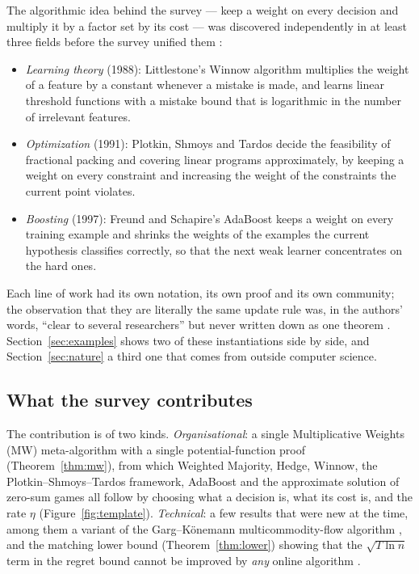 \documentclass[11pt,a4paper]{article}
\theoremstyle{plain}
\theoremstyle{definition}
\newcommand{\sq}[1]{\sqrt{#1}}
\begin{document}
The algorithmic idea behind the survey --- keep a weight on every decision and multiply it by a factor set by its cost --- was discovered independently in at least three fields before the survey unified them \cite[Section~1]{AHK12}:
\begin{itemize}[nosep]
  \item \emph{Learning theory} (1988): Littlestone's Winnow algorithm \cite{Littlestone88} multiplies the weight of a feature by a constant whenever a mistake is made, and learns linear threshold functions with a mistake bound that is logarithmic in the number of irrelevant features.
  \item \emph{Optimization} (1991): Plotkin, Shmoys and Tardos \cite{PST95} decide the feasibility of fractional packing and covering linear programs approximately, by keeping a weight on every constraint and increasing the weight of the constraints the current point violates.
  \item \emph{Boosting} (1997): Freund and Schapire's AdaBoost \cite{FS97} keeps a weight on every training example and shrinks the weights of the examples the current hypothesis classifies correctly, so that the next weak learner concentrates on the hard ones.
\end{itemize}
Each line of work had its own notation, its own proof and its own community; the observation that they are literally the same update rule was, in the authors' words, ``clear to several researchers'' but never written down as one theorem \cite[p.~122]{AHK12}. Section~\ref{sec:examples} shows two of these instantiations side by side, and Section~\ref{sec:nature} a third one that comes from outside computer science.

\subsection{What the survey contributes}

The contribution is of two kinds.
\emph{Organisational}: a single Multiplicative Weights (MW) meta-algorithm with a single potential-function proof (Theorem~\ref{thm:mw}), from which Weighted Majority, Hedge, Winnow, the Plotkin--Shmoys--Tardos framework, AdaBoost and the approximate solution of zero-sum games all follow by choosing what a decision is, what its cost is, and the rate $\eta$ (Figure~\ref{fig:template}).
\emph{Technical}: a few results that were new at the time, among them a variant of the Garg--K\"onemann multicommodity-flow algorithm \cite[Section~3.4]{AHK12}, and the matching lower bound (Theorem~\ref{thm:lower}) showing that the $\sq{T\ln n}$ term in the regret bound cannot be improved by \emph{any} online algorithm \cite[Section~4]{AHK12}.
\end{document}
